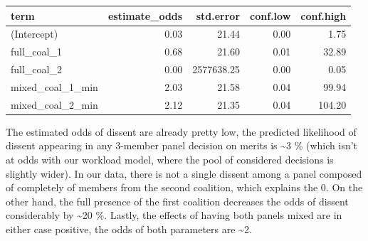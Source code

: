 \documentclass[
  11pt,
]{article}
\begin{document}
\begin{longtable}[]{@{}lrrrr@{}}
\toprule\noalign{}
term & estimate\_odds & std.error & conf.low & conf.high \\
\midrule\noalign{}
\endhead
\bottomrule\noalign{}
\endlastfoot
(Intercept) & 0.03 & 21.44 & 0.00 & 1.75 \\
full\_coal\_1 & 0.68 & 21.60 & 0.01 & 32.89 \\
full\_coal\_2 & 0.00 & 2577638.25 & 0.00 & 0.05 \\
mixed\_coal\_1\_min & 2.03 & 21.58 & 0.04 & 99.94 \\
mixed\_coal\_2\_min & 2.12 & 21.35 & 0.04 & 104.20 \\
\end{longtable}

The estimated odds of dissent are already pretty low, the predicted
likelihood of dissent appearing in any 3-member panel decision on merits
is \textasciitilde3 \% (which isn't at odds with our workload model,
where the pool of considered decisions is slightly wider). In our data,
there is not a single dissent among a panel composed of completely of
members from the second coalition, which explains the 0. On the other
hand, the full presence of the first coalition decreases the odds of
dissent considerably by \textasciitilde20 \%. Lastly, the effects of
having both panels mixed are in either case positive, the odds of both
parameters are \textasciitilde2.
\end{document}
